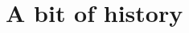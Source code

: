 \documentclass{llncs}
\begin{document}
    \maketitle
    \clearpage

    \section{A bit of history}
    
\end{document}
